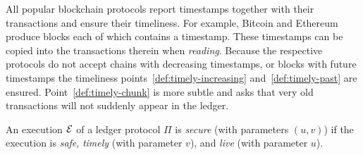 All popular blockchain protocols report timestamps together with their
transactions and ensure their timeliness. For example, Bitcoin and Ethereum
produce blocks each of which contains a timestamp. These timestamps can be copied
into the transactions therein when \emph{reading}. Because the respective protocols do not accept
chains with decreasing timestamps, or blocks with future timestamps the timeliness
points~\ref{def:timely-increasing} and~\ref{def:timely-past} are ensured.
Point~\ref{def:timely-chunk} is more subtle and asks that very old transactions will
not suddenly appear in the ledger.

\begin{definition}[Secure]
  An execution $\mathcal{E}$ of a ledger protocol $\Pi$ is \emph{secure} (with parameters $(u, v)$) if the execution
  is \emph{safe}, \emph{timely} (with parameter $v$), and \emph{live} (with parameter $u$).
\end{definition}
